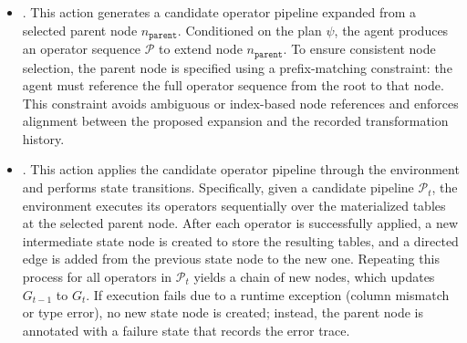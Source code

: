 \begin{itemize}[leftmargin=1em]
    \item {}.
    This action generates a candidate operator pipeline expanded from a selected parent node $n_{\texttt{parent}}$. Conditioned on the plan $\psi$, the agent produces an operator sequence $\mathcal{P}$ to extend node $n_{\texttt{parent}}$. To ensure consistent node selection, the parent node is specified using a prefix-matching constraint: the agent must reference the full operator sequence from the root to that node. This constraint avoids ambiguous or index-based node references and enforces alignment between the proposed expansion and the recorded transformation history.

    

    \item {}. 
    This action applies the candidate operator pipeline through the environment and performs state transitions. Specifically, given a candidate pipeline $\mathcal{P}_t$, the environment executes its operators sequentially over the materialized tables at the selected parent node. After each operator is successfully applied, a new intermediate state node is created to store the resulting tables, and a directed edge is added from the previous state node to the new one. Repeating this process for all operators in $\mathcal{P}_t$ yields a chain of new nodes, which updates $G_{t-1}$ to $G_t$.
    If execution fails due to a runtime exception (\eg column mismatch or type error), no new state node is created; instead, the parent node is annotated with a failure state that records the error trace. 
    

\end{itemize}
